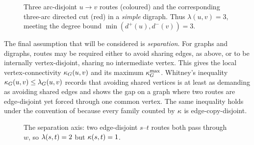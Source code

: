 \begin{figure}[ht]

\caption{Three arc-disjoint $u\to v$ routes (coloured) and the corresponding three-arc directed cut (red) in a \emph{simple} digraph. Thus $\lambda(u,v)=3$, meeting the degree bound $\min(d^+(u),d^-(v))=3$.}
\label{fig:directed-lambda}
\end{figure}

The final assumption that will be considered is \emph{separation}. For graphs
and digraphs, routes may be required either to avoid sharing edges, as above,
or to be internally vertex-disjoint, sharing no intermediate vertex. This gives
the local vertex-connectivity $\kappa_G(u, v)$ and its maximum
$\kappa_G^{\max}$.
Whitney's inequality $\kappa_G(u, v) \le \lambda_G(u, v)$ \cite{Whitney32} records that avoiding shared vertices is at least as demanding as avoiding shared edges and  shows the gap on a graph where two routes are edge-disjoint yet forced through one common vertex. The same inequality holds under the convention of  because every family counted by $\kappa$ is edge-copy-disjoint.

\begin{figure}[ht]
\centering
{}
\caption{The separation axis: two edge-disjoint $s$--$t$ routes both pass through $w$, so $\lambda(s,t)=2$ but $\kappa(s,t)=1$.}
\label{fig:edge-vs-vertex}
\end{figure}


